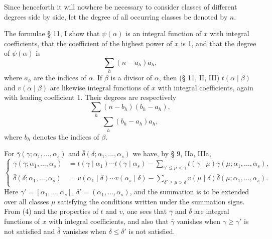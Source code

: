 Since henceforth it will nowhere be necessary to consider classes of different degrees side by side, let the degree of all occurring classes be denoted by $n$.

The formulae § 11, I show that $\psi(\alpha)$ is an integral function of $x$ with integral coefficients, that the coefficient of the highest power of $x$ is 1, and that the degree of $\psi(\alpha)$ is
\begin{equation}
 \sum_h(n-a_h)a_h,
\tag{1}
\end{equation}
where $a_h$ are the indices of $\alpha$. If $\beta$ is a divisor of $\alpha$, then (§ 11, II, III) $t(\alpha\mid\beta)$ and $v(\alpha\mid\beta)$ are likewise integral functions of $x$ with integral coefficients, again with leading coefficient 1. Their degrees are respectively
\begin{equation}
 \sum_h(n-b_h)(b_h-a_h),
\tag{2}
\end{equation}
\begin{equation}
 \sum_h(b_h-a_h)a_h,
\tag{3}
\end{equation}
where $b_h$ denotes the indices of $\beta$.

For $\bar\gamma(\gamma;\alpha_1,\ldots,\alpha_s)$ and $\bar\delta(\delta;\alpha_1,\ldots,\alpha_s)$ we have, by § 9, IIa, IIIa,
\begin{equation}
\left\{
\begin{aligned}
 \bar\gamma(\gamma;\alpha_1,\ldots,\alpha_s)
 &=t(\gamma\mid\alpha_1)\cdots t(\gamma\mid\alpha_s)
 -\sum_{\gamma'\le\mu<\gamma}t(\gamma\mid\mu)\bar\gamma(\mu;\alpha_1,\ldots,\alpha_s),\\
 \bar\delta(\delta;\alpha_1,\ldots,\alpha_s)
 &=v(\alpha_1\mid\delta)\cdots v(\alpha_s\mid\delta)
 -\sum_{\delta'\ge\mu>\delta}v(\mu\mid\delta)\bar\delta(\mu;\alpha_1,\ldots,\alpha_s).
\end{aligned}
\right.
\tag{4}
\end{equation}
Here $\gamma'=[\alpha_1,\ldots,\alpha_s]$, $\delta'=(\alpha_1,\ldots,\alpha_s)$, and the summation is to be extended over all classes $\mu$ satisfying the conditions written under the summation signs. From (4) and the properties of $t$ and $v$, one sees that $\bar\gamma$ and $\bar\delta$ are integral functions of $x$ with integral coefficients, and also that $\bar\gamma$ vanishes when $\gamma\ge\gamma'$ is not satisfied and $\bar\delta$ vanishes when $\delta\le\delta'$ is not satisfied.

